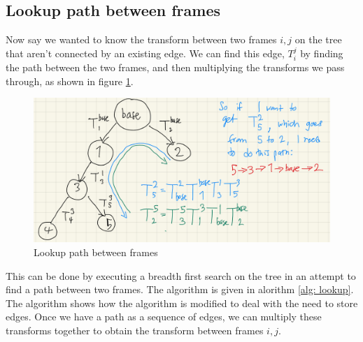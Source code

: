 \subsection{Lookup path between frames}

Now say we wanted to know the transform between two frames $i, j$ on the tree that aren't connected by an existing edge. 
We can find this edge, $T_i^j$ by finding the path between the two frames, and then multiplying the transforms we pass through, as shown in figure \ref{fig: lookup}.

\begin{figure}
	\centering
	\includegraphics[width=\textwidth]{images/lookup_path.png}
	\caption{Lookup path between frames}
	\label{fig: lookup}
\end{figure}

This can be done by executing a breadth first search on the tree in an attempt to find a path between two frames. 
The algorithm is given in alorithm \ref{alg: lookup}.
The algorithm shows how the algorithm is modified to deal with the need to store edges. 
Once we have a path as a sequence of edges, we can multiply these transforms together to obtain the transform between frames $i, j$.


